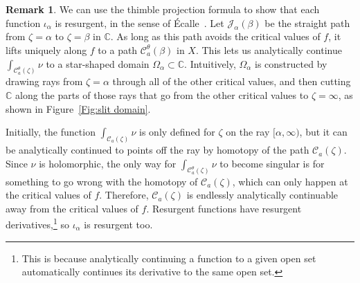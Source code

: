 \documentclass{article}
\newcommand{\C}{\mathbb{C}}
\theoremstyle{definition}
\newtheorem{remark}[definition]{Remark}
\theoremstyle{plain}
\begin{document}
\begin{remark}
We can use the thimble projection formula to show that each function $\iota_\alpha$ is resurgent, in the sense of \'{E}calle~\cite[Section~1]{EcalleI}. Let $\mathcal{J}_\alpha(\beta)$ be the straight path from $\zeta = \alpha$ to $\zeta = \beta$ in $\C$. As long as this path avoids the critical values of $f$, it lifts uniquely along $f$ to a path $\mathcal{C}_a^\theta(\beta)$ in $X$. This lets us analytically continue $\int_{\mathcal{C}_a^\theta(\zeta)} \nu$ to a star-shaped domain $\Omega_\alpha \subset \C$. Intuitively, $\Omega_\alpha$ is constructed by drawing rays from $\zeta = \alpha$ through all of the other critical values, and then cutting $\C$ along the parts of those rays that go from the other critical values to $\zeta = \infty$, as shown in Figure~\ref{Fig:slit domain}.
\begin{center}
\label{Fig:slit domain}
\end{center}
Initially, the function $\int_{\mathcal{C}_a(\zeta)} \nu$ is only defined for $\zeta$ on the ray $[\alpha, \infty)$, but it can be analytically continued to points off the ray by homotopy of the path $\mathcal{C}_a(\zeta)$. Since $\nu$ is holomorphic, the only way for $\int_{\mathcal{C}^\theta_a(\zeta)} \nu$ to become singular is for something to go wrong with the homotopy of $\mathcal{C}_a(\zeta)$, which can only happen at the critical values of $f$. Therefore, $\mathcal{C}_a(\zeta)$ is endlessly analytically continuable away from the critical values of $f$. Resurgent functions have resurgent derivatives,\footnote{This is because analytically continuing a function to a given open set automatically continues its derivative to the same open set.} so $\iota_\alpha$ is resurgent too.
\end{remark}
\end{document}
